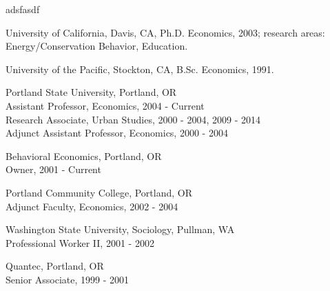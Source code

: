 \documentclass[Computer Science]{vita}
\begin{document}


  
adsfasdf  

\begin{vita}

  \begin{Degrees}
  \item University of California, Davis, CA, Ph.D. Economics, 2003;
    research areas: Energy/Conservation Behavior, Education.

  \item University of the Pacific, Stockton, CA, B.Sc. Economics,
    1991.
  \end{Degrees}

  \begin{Experience}
	
  \item Portland State University,  Portland, OR\\
    Assistant Professor, Economics, 2004 - Current\\
    Research Associate, Urban Studies, 2000 - 2004, 2009 - 2014\\
    Adjunct Assistant Professor, Economics, 2000 - 2004
	
  \item Behavioral Economics, Portland, OR\\
    Owner, 2001 - Current
		
  \item Portland Community College, Portland, OR\\
    Adjunct Faculty, Economics, 2002 - 2004
	
  \item Washington State University, Sociology, Pullman, WA\\
    Professional Worker II, 2001 - 2002
	
  \item Quantec, Portland, OR\\
    Senior Associate, 1999 - 2001
	

\end{Experience}
\end{vita}
\end{document}
